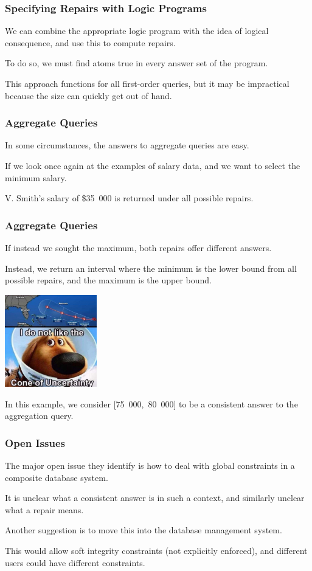\begin{frame}
\frametitle{Specifying Repairs with Logic Programs}

We can combine the appropriate logic program with the idea of logical consequence, and use this to compute repairs.

To do so, we must find atoms true in every answer set of the program. 

This approach functions for all first-order queries, but it may be impractical because the size can quickly get out of hand.

\end{frame}

\begin{frame}
\frametitle{Aggregate Queries}

In some circumstances, the answers to aggregate queries are easy. 

If we look once again at the examples of salary data, and we want to select the minimum salary. 

V. Smith's salary of \$35~000 is returned under all possible repairs. 

\end{frame}

\begin{frame}
\frametitle{Aggregate Queries}

If instead we sought the maximum, both repairs offer different answers. 

Instead, we return an interval where the minimum is the lower bound from all possible repairs, and the maximum is the upper bound. 


\begin{center}
	\includegraphics[width=0.3\textwidth]{images/uncertainty.jpg}
\end{center}

In this example, we consider [75~000,~80~000] to be a consistent answer to the aggregation query.

\end{frame}

\begin{frame}
\frametitle{Open Issues}

The major open issue they identify is how to deal with global constraints in a composite database system. 

It is unclear what a consistent answer is in such a context, and similarly unclear what a repair means.

Another suggestion is to move this into the database management system. 

This would allow soft integrity constraints (not explicitly enforced), and different users could have different constraints.

\end{frame}

